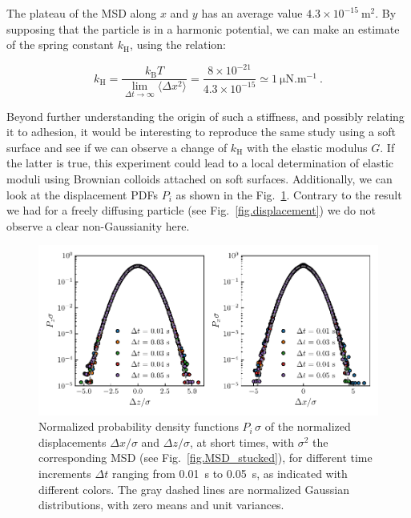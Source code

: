 The plateau of the MSD along  $x$ and $y$ has an average value   $4.3 \times 10 ^{-15} ~ \mathrm{m^2}$. By supposing that the particle is in a harmonic potential, we can make an estimate of the spring constant $k_\mathrm{H}$, using the relation:

\begin{equation}
	k_\mathrm{H} = \frac{  k_\mathrm{B} T}{ \lim\limits_{\Delta t \rightarrow \infty }\langle \Delta x ^2 \rangle} = \frac{8 \times 10^{-21}}{4.3 \times 10 ^{-15}} \simeq 1 ~ \mathrm{\mu N . m^{-1}}~.
\end{equation}

Beyond further understanding the origin of such a stiffness, and possibly relating it to adhesion, it would be interesting to reproduce the same study using a soft surface and see if we can observe a change of $k_\mathrm{H}$ with the elastic modulus $G$. If the latter is true, this experiment could lead to a local determination of elastic moduli using Brownian colloids attached on soft surfaces. Additionally, we can look at the displacement \gls{PDF}s $P_i$ as shown in the Fig.~\ref{fig.P_dxz_stucked}. Contrary to the result we had for a freely diffusing particle (see Fig.~\ref{fig.displacement}) we do not observe a clear non-Gaussianity here.


\begin{figure}[H]
	\centering
	\includegraphics{02_body/chapter4/images/stucked_particle/P_xz_stucked.pdf}
	\caption{ Normalized probability density functions $P_i\,\sigma$ of the normalized displacements $\Delta x/\sigma$ and $\Delta z/\sigma$, at short times, with $\sigma^2$ the corresponding MSD (see Fig.~\ref{fig.MSD_stucked}), for different time increments $\Delta t$ ranging from 0.01~s to 0.05~s, as indicated with different colors. The gray dashed lines are normalized Gaussian distributions, with zero means and unit variances.}
	\label{fig.P_dxz_stucked}
\end{figure}


